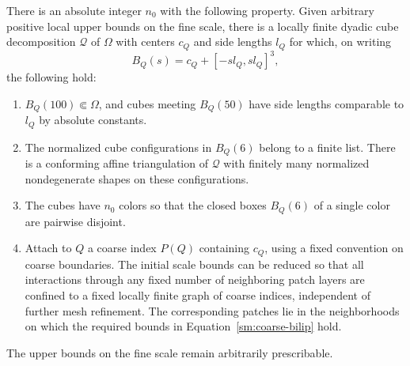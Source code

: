 \begin{lemma}
\label{sm:mesh}
There is an absolute integer $n_0$ with the following property.
Given arbitrary positive local upper bounds on the fine scale, there
is a locally finite dyadic cube decomposition $\mathcal Q$ of $\Omega$
with centers $c_Q$ and side lengths $l_Q$ for which, on writing
\begin{equation}
 \label{sm:patch-box}
 B_Q(s)=c_Q+[-s l_Q,s l_Q]^3,
\end{equation}
the following hold:
\begin{enumerate}[label=\textup{(\roman*)}]
 \item $B_Q(100)\Subset\Omega$, and cubes meeting $B_Q(50)$ have
 side lengths comparable to $l_Q$ by absolute constants.
 \item The normalized cube configurations in $B_Q(6)$ belong to a
 finite list.  There is a conforming affine triangulation of
 $\mathcal Q$ with finitely many normalized nondegenerate shapes
 on these configurations.
 \item The cubes have $n_0$ colors so that the closed boxes $B_Q(6)$
 of a single color are pairwise disjoint.
 \item Attach to $Q$ a coarse index $P(Q)$ containing $c_Q$, using
 a fixed convention on coarse boundaries.  The initial scale
 bounds can be reduced so that all interactions through any fixed
 number of neighboring patch layers are confined to a fixed
 locally finite graph of coarse indices, independent of further
 mesh refinement.  The corresponding patches lie in the
 neighborhoods on which the required bounds in
 Equation~\eqref{sm:coarse-bilip} hold.
\end{enumerate}
The upper bounds on the fine scale remain arbitrarily prescribable.
\end{lemma}

